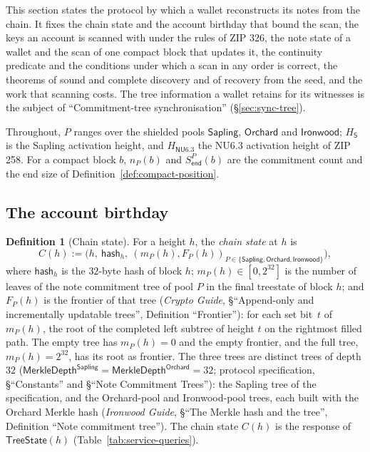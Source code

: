 \documentclass[11pt,a4paper]{article}
\theoremstyle{definition}
\newtheorem{definition}[theorem]{Definition}
\begin{document}
This section states the protocol by which a wallet reconstructs its notes
from the chain. It fixes the chain state and the account birthday that bound
the scan, the keys an account is scanned with under the rules of ZIP 326,
the note state of a wallet and the scan of one compact block that updates
it, the continuity predicate and the conditions under which a scan in any
order is correct, the theorems of sound and complete discovery and of
recovery from the seed, and the work that scanning costs. The tree
information a wallet retains for its witnesses is the subject of
``Commitment-tree synchronisation'' (\S\ref{sec:sync-tree}).

Throughout, $P$ ranges over the shielded pools $\mathsf{Sapling}$,
$\mathsf{Orchard}$ and $\mathsf{Ironwood}$; $H_{\mathsf{S}}$ is the Sapling
activation height, and $H_{\mathsf{NU6.3}}$ the NU6.3 activation height of
ZIP 258. For a compact block $b$, $n_P(b)$ and $S^{P}_{\mathsf{end}}(b)$ are
the commitment count and the end size of
Definition~\ref{def:compact-position}.

\subsection{The account birthday}\label{sec:scan-birthday}

\begin{definition}[Chain state]\label{def:scan-chainstate}
For a height $h$, the \emph{chain state} at $h$ is
\[
  C(h) := \bigl(h,\ \mathsf{hash}_h,\
    (m_P(h), F_P(h))_{P \in \{\mathsf{Sapling}, \mathsf{Orchard},
    \mathsf{Ironwood}\}}\bigr),
\]
where $\mathsf{hash}_h$ is the $32$-byte hash of block $h$;
$m_P(h) \in [0, 2^{32}]$ is the number of leaves of the note commitment
tree of pool $P$ in the final treestate of block $h$; and $F_P(h)$ is the
frontier of that tree (\emph{Crypto Guide}, \S``Append-only and
incrementally updatable trees'', Definition ``Frontier''): for each set
bit~$t$ of $m_P(h)$, the root of the completed left subtree of height $t$
on the rightmost filled path. The empty tree has $m_P(h) = 0$ and the empty
frontier, and the full tree, $m_P(h) = 2^{32}$, has its root as frontier.
The three trees are distinct trees of depth $32$
($\mathsf{MerkleDepth}^{\mathsf{Sapling}} =
\mathsf{MerkleDepth}^{\mathsf{Orchard}} = 32$; protocol specification,
\S``Constants'' and \S``Note Commitment Trees''): the Sapling tree of the
specification, and the Orchard-pool and Ironwood-pool trees, each built with
the Orchard Merkle hash (\emph{Ironwood Guide}, \S``The Merkle hash and the
tree'', Definition ``Note commitment tree''). The chain state $C(h)$ is the
response of $\mathsf{TreeState}(h)$ (Table~\ref{tab:service-queries}).
\end{definition}
\end{document}
